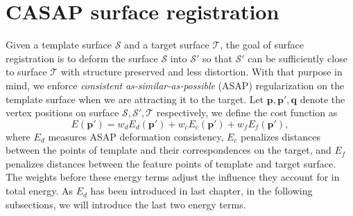 \section{CASAP surface registration}
 Given a template surface $\mathcal S$ and a target surface $\mathcal T$, the goal of surface registration is to deform the surface $\mathcal S$ into $ \mathcal S'$ so that $\mathcal{S'}$ can be sufficiently close to surface $\mathcal T$ with structure preserved and less distortion. With that purpose in mind, we enforce \emph{consistent} \emph{as-similar-as-possible} (ASAP) regularization on the template surface when we are attracting it to the target. Let $\mathbf p, \mathbf  p',\mathbf  q$ denote the vertex positions on surface $\mathcal S,\mathcal  S',\mathcal  T$ respectively, we define the cost function as
\begin{equation}
E(\mathbf p') = w_{d}E_{d}(\mathbf p') + w_cE_c(\mathbf p') + w_fE_f(\mathbf p'), \label{energy}
\end{equation}
where $E_{d}$ measures ASAP deformation consistency, $E_c$ penalizes distances between the points of template and their correspondences on the target, and $E_f$ penalizes distances between the feature points of template and target surface. The weights before these energy terms adjust the influence they account for in total energy. As $E_{d}$ has been introduced in last chapter, in the following subsections, we will introduce the last two energy terms.

